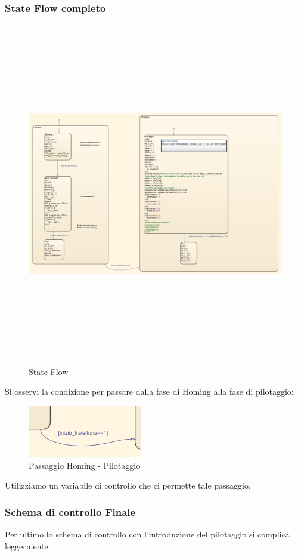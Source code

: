\documentclass{article}
\begin{document}
\subsubsection{State Flow completo}
\begin{figure}[H]
    \centering
    \includegraphics[width=12cm,height=15cm,keepaspectratio]{./stateflow/stateflowldmcompl.png}
    \caption{State Flow }
\end{figure}
Si osservi la condizione per passare dalla fase di Homing alla fase di pilotaggio:
\begin{figure}[H]
    \centering
    \includegraphics[width=.4\textwidth]{./stateflow/condiziones.png}
    \caption{Passaggio Homing - Pilotaggio}
\end{figure}
Utilizziamo un variabile di controllo che ci permette tale passaggio.

\subsubsection{Schema di controllo Finale}
Per ultimo lo schema di controllo con l'introduzione del pilotaggio si complica leggermente.
\end{document}
